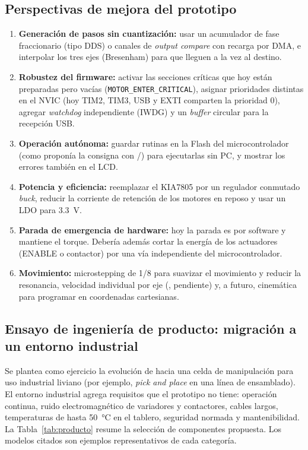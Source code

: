 \subsection{Perspectivas de mejora del prototipo}
\begin{enumerate}
  \item \textbf{Generación de pasos sin cuantización:} usar un acumulador de fase fraccionario
        (tipo DDS) o canales de \emph{output compare} con recarga por DMA, e interpolar los tres
        ejes (Bresenham) para que lleguen a la vez al destino.
  \item \textbf{Robustez del firmware:} activar las secciones críticas que hoy están preparadas
        pero vacías (\texttt{MOTOR\_ENTER\_CRITICAL}), asignar prioridades distintas en el NVIC
        (hoy TIM2, TIM3, USB y EXTI comparten la prioridad 0), agregar \emph{watchdog}
        independiente (IWDG) y un \emph{buffer} circular para la recepción USB.
  \item \textbf{Operación autónoma:} guardar rutinas en la Flash del microcontrolador (como
        proponía la consigna con /) para ejecutarlas sin PC, y mostrar los
        errores también en el LCD.
  \item \textbf{Potencia y eficiencia:} reemplazar el KIA7805 por un regulador conmutado
        \emph{buck}, reducir la corriente de retención de los motores en reposo y usar un LDO
        para \SI{3,3}{\volt}.
  \item \textbf{Parada de emergencia de hardware:} hoy la parada es por software y mantiene el
        torque. Debería además cortar la energía de los actuadores (ENABLE o contactor) por una
        vía independiente del microcontrolador.
  \item \textbf{Movimiento:} microstepping de 1/8 para suavizar el movimiento y reducir la
        resonancia, velocidad individual por eje (, pendiente) y, a futuro, cinemática
        para programar en coordenadas cartesianas.
\end{enumerate}

\subsection{Ensayo de ingeniería de producto: migración a un entorno industrial}
Se plantea como ejercicio la evolución de \tails{} hacia una celda de manipulación para uso
industrial liviano (por ejemplo, \emph{pick and place} en una línea de ensamblado). El
entorno industrial agrega requisitos que el prototipo no tiene: operación continua, ruido
electromagnético de variadores y contactores, cables largos, temperaturas de hasta
\SI{50}{\celsius} en el tablero, seguridad normada y mantenibilidad. La
Tabla~\ref{tab:producto} resume la selección de componentes propuesta. Los modelos citados son
ejemplos representativos de cada categoría.


